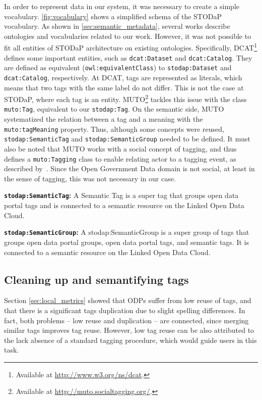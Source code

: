 In order to represent data in our system, it was necessary to create a simple vocabulary.
\autoref{fig:vocabulary} shows a simplified schema of the STODaP vocabulary.
As shown in \autoref{sec:semantic_metadata}, several works describe ontologies and vocabularies related to our work.
However, it was not possible to fit all entities of STODaP architecture on existing ontologies.
Specifically, DCAT\footnote{Available at \url{http://www.w3.org/ns/dcat}.} defines some important entities, such as \texttt{dcat:Dataset} and \texttt{dcat:Catalog}.
They are defined as equivalent (\texttt{owl:equivalentClass}) to \texttt{stodap:Dataset} and \texttt{dcat:Catalog}, respectively.
At DCAT, tags are represented as literals, which means that two tags with the same label do not differ.
This is not the case at STODaP, where each tag is an entity.
MUTO\footnote{Available at \url{http://muto.socialtagging.org/}.} tackles this issue with the class \texttt{muto:Tag}, equivalent to our \texttt{stodap:Tag}.
On the semantic side, MUTO systematized the relation between a tag and a meaning with the \texttt{muto:tagMeaning} property.
Thus, although some concepts were reused, \texttt{stodap:SemanticTag} and \texttt{stodap:SemanticGroup} needed to be defined.
It must also be noted that MUTO works with a social concept of tagging, and thus defines a \texttt{muto:Tagging} class to enable relating actor to a tagging event, as described by~.
Since the Open Government Data domain is not social, at least in the sense of tagging, this was not necessary in our case.

\noindent \textbf{\texttt{stodap:SemanticTag}:} A Semantic Tag is a super tag that groups open data portal tags and is connected to a semantic resource on the Linked Open Data Cloud.

\noindent \textbf{\texttt{stodap:SemanticGroup}:} A stodap:SemanticGroup is a super group of tags that groups open data portal groups, open data portal tags, and semantic tags. It is connected to a semantic resource on the Linked Open Data Cloud.


\subsection{Cleaning up and semantifying tags}
\label{sec:tag_manager_plugin}

Section \ref{sec:local_metrics} showed that ODPs suffer from low reuse of tags, and that there is a significant tags duplication due to slight spelling differences. 
In fact, both problems -- low reuse and duplication -- are connected, since merging similar tags improves tag reuse.
However, low tag reuse can be also attributed to the lack absence of a standard tagging procedure, which would guide users in this task.


